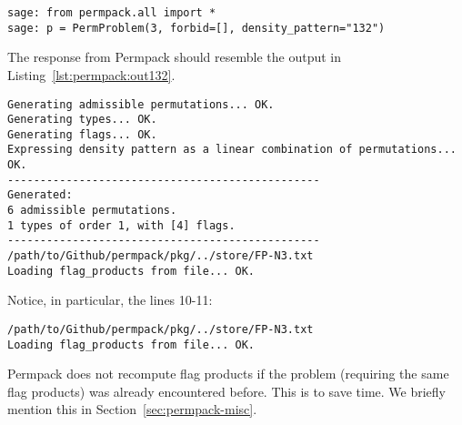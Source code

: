  {}
\begin{lstlisting}
sage: from permpack.all import *
sage: p = PermProblem(3, forbid=[], density_pattern="132")
\end{lstlisting}
The response from Permpack should resemble the output in Listing~\ref{lst:permpack:out132}.
\begin{lstlisting}
Generating admissible permutations... OK.
Generating types... OK.
Generating flags... OK.
Expressing density pattern as a linear combination of permutations... OK.
------------------------------------------------
Generated:
6 admissible permutations.
1 types of order 1, with [4] flags.
------------------------------------------------
/path/to/Github/permpack/pkg/../store/FP-N3.txt
Loading flag_products from file... OK.
\end{lstlisting}
Notice, in particular, the lines 10-11:
\begin{lstlisting}
/path/to/Github/permpack/pkg/../store/FP-N3.txt
Loading flag_products from file... OK.
\end{lstlisting}
Permpack does not recompute flag products if the problem (requiring the same flag products) was already encountered before. This is to save time. We briefly mention this in Section~\ref{sec:permpack-misc}.

